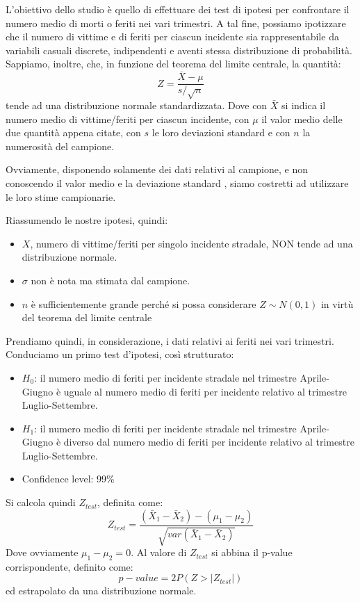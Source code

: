 \documentclass[12pt,a4paper,final,oneside]{article}			%
\begin{document}
        L’obiettivo dello studio è quello di effettuare dei test di ipotesi per confrontare il numero medio di morti o feriti nei vari trimestri. A tal fine, possiamo ipotizzare che il numero di vittime e di feriti per ciascun incidente sia rappresentabile da variabili casuali discrete, indipendenti e aventi stessa distribuzione di probabilità. 
        Sappiamo, inoltre, che, in funzione del teorema del limite centrale, la quantità:
        \[
            Z = \frac {\bar X - \mu}{s / {\sqrt n } }
        \]
        tende ad una distribuzione normale standardizzata. Dove con $\bar X $ si indica il numero medio di vittime/feriti per ciascun incidente, con $\mu$ il valor medio delle due quantità appena citate, con $s$ le loro deviazioni standard e con $n$ la numerosità del campione.
        
        Ovviamente, disponendo solamente dei dati relativi al campione, e non conoscendo il valor medio  e la deviazione standard , siamo costretti ad utilizzare le loro stime campionarie. 
        
        Riassumendo le nostre ipotesi, quindi:
        \begin{itemize}
            \item $X$, numero di vittime/feriti per singolo incidente stradale, NON tende ad una distribuzione normale.
            \item $\sigma$ non è nota ma stimata dal campione.
	    \item $n$ è sufficientemente grande perché si possa considerare $Z \sim N(0, 1)$ in virtù del teorema del limite centrale
        \end{itemize}
        
        Prendiamo quindi, in considerazione, i dati relativi ai feriti nei vari trimestri. Conduciamo un primo test d’ipotesi, così strutturato:
        \begin{itemize}
            \item $H_0$: il numero medio di feriti per incidente stradale nel trimestre Aprile-Giugno è uguale al numero medio di feriti per incidente relativo al trimestre Luglio-Settembre.
            \item $H_1$: il numero medio di feriti per incidente stradale nel trimestre Aprile-Giugno è diverso dal numero medio di feriti per incidente relativo al trimestre Luglio-Settembre. 
            \item Confidence level: 99\%
        \end{itemize}
        Si calcola quindi $Z_{test}$, definita come:
        \[
            Z_{test} = \frac { (\bar X _1 - \bar X_2) - ( \mu_1 - \mu_2)} { \sqrt{var(\bar X_1 - \bar X_2)}}
        \]
        Dove ovviamente $\mu_1 - \mu_2 = 0 $. Al valore di $Z_{test}$ si abbina il p-value corrispondente, definito come:
        \[
            p-value = 2P(Z > | Z_{test}|)
        \]
        ed estrapolato da una distribuzione normale.
\end{document}
